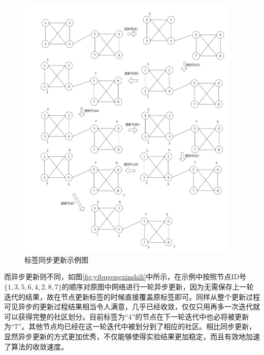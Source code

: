 \begin{figure}
  \centering
  \includegraphics[width=0.95\textwidth]{figures/tongbugengxinshili}
  \caption{标签同步更新示例图}\label{fig:tongbugengxinshili}
\end{figure}

而异步更新则不同，如图\ref{fig:yibugengxinshili}中所示，在示例中按照节点ID号$\{1,3,5,6,4,2,8,7 \} $的顺序对原图中网络进行一轮异步更新，因为无需保存上一轮迭代的结果，故在节点更新标签的时候直接覆盖原标签即可。同样从整个更新过程可见异步的更新过程结果相当令人满意，几乎已经收敛，仅仅只用再多一次迭代就可以获得完整的社区划分。目前标签为“4”的节点在下一轮迭代中也必将被更新为“7”。其他节点均已经在这一轮迭代中被划分到了相应的社区。相比同步更新，显然异步更新的方式更加优秀，不仅能够使得实验结果更加稳定，而且有效地加速了算法的收敛速度。


